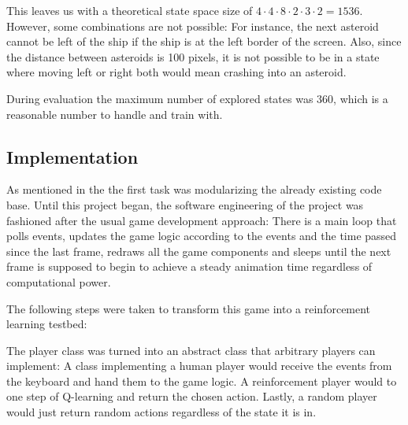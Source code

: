 \documentclass[a4paper,10pt]{article}
\begin{document}
This leaves us with a theoretical state space size of $4 \cdot 4 \cdot 8 \cdot 2 \cdot 3 \cdot 2 = 1536$.
However, some combinations are not possible: For instance, the next asteroid cannot be left of the ship if the ship is at the left border of the screen.
Also, since the distance between asteroids is 100 pixels, it is not possible to be in a state where moving left or right both would mean crashing into an asteroid.

During evaluation the maximum number of explored states was $360$, which is a reasonable number to handle and train with.

\subsection{Implementation}

As mentioned in the  the first task was modularizing the already existing code base.
Until this project began, the software engineering of the project was fashioned after the usual game development approach:
There is a main loop that polls events, updates the game logic according to the events and the time passed since the last frame, redraws all the game components and sleeps until the next frame is supposed to begin to achieve a steady animation time regardless of computational power.

The following steps were taken to transform this game into a reinforcement learning testbed:

The player class was turned into an abstract class that arbitrary players can implement: A class implementing a human player would receive the events from the keyboard and hand them to the game logic.
A reinforcement player would to one step of Q-learning and return the chosen action.
Lastly, a random player would just return random actions regardless of the state it is in.
\end{document}

